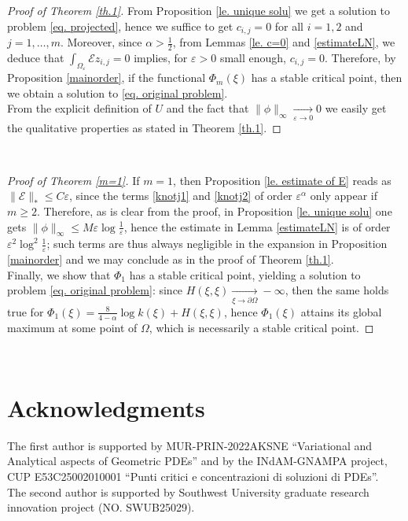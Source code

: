 \documentclass[11pt]{article}
\begin{document}
\begin{proof}[Proof of Theorem \ref{th.1}] From Proposition \ref{le. unique solu} we get a solution to problem \eqref{eq. projected}, hence we suffice to get $c_{i,j}=0$ for all $i=1,2$ and $j=1,\dots,m$. Moreover, since $\alpha>\frac12$, from Lemmas \ref{le. c=0} and \ref{estimateLN}, we deduce that $\int_{\Omega_\varepsilon}\mathcal Ez_{i,j}=0$ implies, for $\varepsilon>0$ small enough, $c_{i,j}=0$. Therefore, by Proposition \ref{mainorder}, if the functional $\Phi_m(\xi)$ has a stable critical point, then we obtain a solution to \eqref{eq. original problem}.\\
From the explicit definition of $U$ and the fact that $\|\phi\|_\infty\underset{\varepsilon\to0}\to0$ we easily get the qualitative properties as stated in Theorem \ref{th.1}.
\end{proof}\

\begin{proof}[Proof of Theorem \ref{m=1}]
If $m=1$, then Proposition \ref{le. estimate of E} reads as $\|\mathcal E\|_\ast\le C\varepsilon$, since the terms \eqref{knotj1} and \eqref{knotj2} of order $\varepsilon^\alpha$ only appear if $m\ge2$. Therefore, as is clear from the proof, in Proposition \ref{le. unique solu} one gets $\|\phi\|_\infty\le M\varepsilon\log\frac1\varepsilon$, hence the estimate in Lemma \ref{estimateLN} is of order $\varepsilon^2\log^2\frac1\varepsilon$; such terms are thus always negligible in the expansion in Proposition \ref{mainorder} and we may conclude as in the proof of Theorem \ref{th.1}.\\
Finally, we show that $\Phi_1$ has a stable critical point, yielding a solution to problem \eqref{eq. original problem}: since $H(\xi,\xi)\underset{\xi\to\partial\Omega}\to-\infty$, then the same holds true for $\Phi_1(\xi)=\frac8{4-\alpha}\log k(\xi)+H(\xi,\xi)$, hence $\Phi_1(\xi)$ attains its global maximum at some point of $\Omega$, which is necessarily a stable critical point.
\end{proof}\

\section*{Acknowledgments}
The first author is supported by MUR-PRIN-2022AKSNE ``Variational and Analytical  aspects of Geometric PDEs'' and by the INdAM-GNAMPA project, CUP E53C25002010001 ``Punti critici e concentrazioni di soluzioni di PDEs''.\\
The second author is supported by Southwest University graduate research innovation project (NO. SWUB25029).
\end{document}
